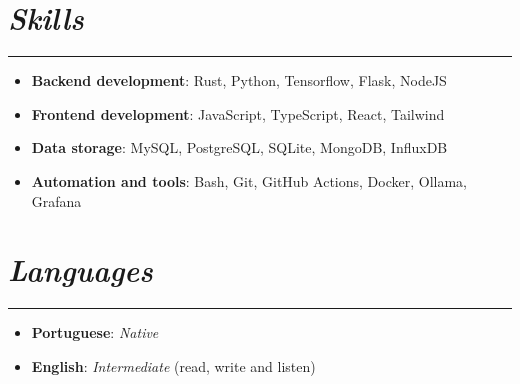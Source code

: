 \documentclass[11pt,a4paper]{article}
\newcommand{\customsection}[1]{
    \section*{{{\textbf{\textit{#1}}}}}

    \vspace{-2em}
    \rule{\textwidth}{0.4pt}

}
\begin{document}
\customsection{Skills}

\begin{itemize}[label=$\bullet$, leftmargin=*]
	\item \textbf{Backend development}: Rust, Python, Tensorflow, Flask, NodeJS
	\item \textbf{Frontend development}: JavaScript, TypeScript, React, Tailwind
	\item \textbf{Data storage}: MySQL, PostgreSQL, SQLite, MongoDB, InfluxDB
	\item \textbf{Automation and tools}: Bash, Git, GitHub Actions, Docker, Ollama, Grafana
\end{itemize}

\customsection{Languages}

\begin{itemize}[label=$\bullet$, leftmargin=*]
	\item \textbf{Portuguese}: \textit{Native} \item \textbf{English}: \textit{Intermediate} (read, write and listen)
\end{itemize}
\end{document}
